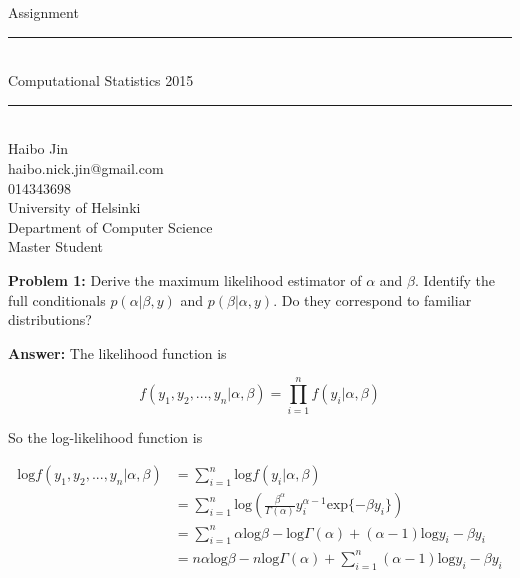 \documentclass[12pt]{article}
\newcommand{\HRule}{\rule{\linewidth}{0.5mm}}
\begin{document}
\begin{titlepage}
\begin{center}

{\Large Assignment}\\[1cm]

\HRule \\[0.4cm]
{ \huge Computational Statistics 2015\\[0.4cm] }

\HRule \\[7.5cm]

{\LARGE Haibo Jin}\\[0.4cm]

{\LARGE haibo.nick.jin@gmail.com}\\[0.4cm]

{\LARGE 014343698}\\[4cm]

{\Large University of Helsinki}\\[0.1cm]
{\Large Department of Computer Science}\\[0.1cm]
{\Large Master Student}\\[0.1cm]

\end{center}
\end{titlepage}


\textbf{Problem 1:} Derive the maximum likelihood estimator of $\alpha$ and $\beta$. Identify the full conditionals $p(\alpha | \beta, y)$ and $p(\beta | \alpha, y)$. Do they correspond to familiar distributions?

\vspace{5mm}

\textbf{Answer:} The likelihood function is

\begin{equation*}
f(y_{1}, y_{2},...,y_{n} | \alpha, \beta) = \prod_{i=1}^n f(y_i | \alpha, \beta)
\end{equation*}

So the log-likelihood function is 

\begin{equation}
\begin{split}
\text{log} f(y_{1}, y_{2},...,y_{n} | \alpha, \beta) &= \sum_{i=1}^n \text{log} f(y_i | \alpha, \beta) \\
&= \sum_{i=1}^n \text{log} ( \frac{\beta^{\alpha}}{\Gamma(\alpha)}y_i^{\alpha-1}\text{exp}\{-\beta y_i\} ) \\
&= \sum_{i=1}^n \alpha \text{log} \beta - \text{log} \Gamma(\alpha) + (\alpha-1)\text{log}y_i - \beta y_i \\
&= n \alpha \text{log} \beta - n \text{log} \Gamma(\alpha) + \sum_{i=1}^n (\alpha-1)\text{log}y_i-\beta y_i\\
\end{split}
\end{equation}
\end{document}
